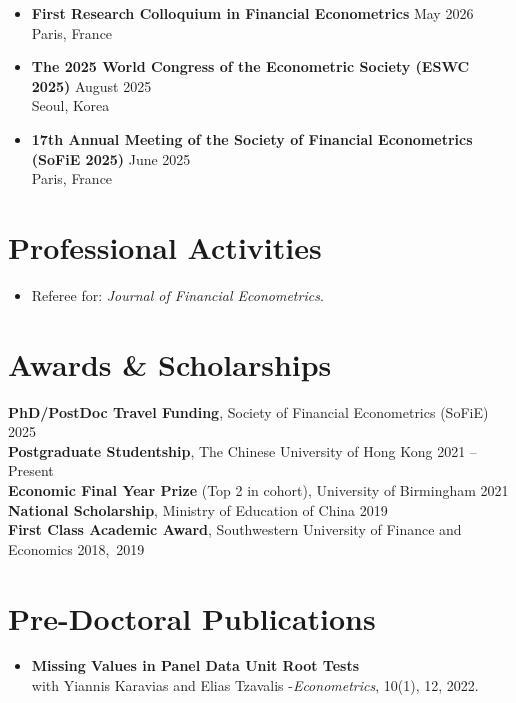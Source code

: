 \documentclass[12pt,a4paper]{article}
\newcommand{\cvdate}[1]{\unskip\nobreak\hfill\penalty100\hbox{}\nobreak\hfill\mbox{#1}}
\begin{document}
\begin{itemize}
    \item \textbf{First Research Colloquium in Financial Econometrics}  \hfill May 2026 \\
    Paris, France

    \item \textbf{The 2025 World Congress of the Econometric Society (ESWC 2025)} \hfill August 2025 \\
    Seoul, Korea
    
    \item \textbf{17th Annual Meeting of the Society of Financial Econometrics (SoFiE 2025)} \hfill June 2025 \\
    Paris, France
\end{itemize}

\section{Professional Activities}

\begin{itemize}
    \item Referee for: \textit{Journal of Financial Econometrics}. 
\end{itemize}



\section{Awards \& Scholarships}

\textbf{PhD/PostDoc Travel Funding}, Society of Financial Econometrics (SoFiE) \hfill 2025 \\
\textbf{Postgraduate Studentship}, The Chinese University of Hong Kong \hfill 2021 -- Present \\
\textbf{Economic Final Year Prize} (Top 2 in cohort), University of Birmingham \hfill 2021\\
\textbf{National Scholarship}, Ministry of Education of China \hfill 2019\\
\textbf{First Class Academic Award}, Southwestern University of Finance and Economics \cvdate{2018, 2019}


\section{Pre-Doctoral Publications}

\begin{itemize}
    \item \textbf{Missing Values in Panel Data Unit Root Tests} \\
    with Yiannis Karavias and Elias Tzavalis -\textit{Econometrics}, 10(1), 12, 2022.
\end{itemize}
\end{document}
